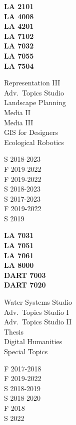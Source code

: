 \documentclass[10pt]{developercv} %
\begin{document}
\begin{minipage}[t]{0.1\textwidth} 
\textbf{LA 2101}\\
\textbf{LA 4008}\\
\textbf{LA 4201}\\
\textbf{LA 7102}\\
\textbf{LA 7032}\\
\textbf{LA 7055}\\
\textbf{LA 7504}\\
\end{minipage}
\begin{minipage}[t]{0.2\textwidth} 
Representation III\\
Adv.~Topics Studio\\
Landscape Planning \\
Media II \\
Media III\\
GIS for Designers\\
Ecological Robotics\\
\end{minipage}
\begin{minipage}[t]{0.2\textwidth} 
S 2018-2023\\
F 2019-2022\\
F 2019-2022\\
S 2018-2023\\
S 2017-2023\\
F 2019-2022\\
S 2019\\
\end{minipage}
\begin{minipage}[t]{0.15\textwidth} 
\textbf{LA 7031}\\
\textbf{LA 7051}\\
\textbf{LA 7061}\\
\textbf{LA 8000}\\
\textbf{DART 7003}\\
\textbf{DART 7020}\\
\end{minipage}
\begin{minipage}[t]{0.2\textwidth} 
Water Systems Studio\\
Adv.~Topics Studio I\\
Adv.~Topics Studio II\\
Thesis\\
Digital Humanities\\
Special Topics\\
\end{minipage}
\begin{minipage}[t]{0.15\textwidth} 
F 2017-2018\\
F 2019-2022\\
S 2018-2019\\
S 2018-2020\\
F 2018\\
S 2022\\
\end{minipage}
\end{document}
